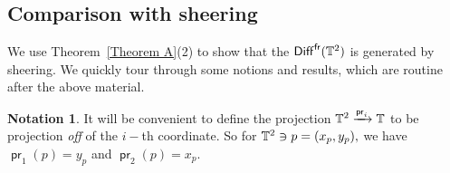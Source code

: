 \documentclass{amsart}
\theoremstyle{definition}
\newtheorem{notation}[theorem]{Notation}
\theoremstyle{remark}
\DeclareMathOperator{\pr}{\mathsf{pr}}
\DeclareMathOperator{\Diff}{{\sf Diff}}
\DeclareMathOperator{\fr}{\sf fr}
\newcommand{\xra}{\xrightarrow}
\begin{document}
\subsection{Comparison with sheering}
We use Theorem~\ref{Theorem A}(2) to show that the $\Diff^{\fr}(\TT^2)$ is generated by sheering.  
We quickly tour through some notions and results, which are routine after the above material.  

\begin{notation}
It will be convenient to define the projection $\TT^{2} \xra{\pr_{i}} \TT$ to be projection \textit{off} of the $i-$th coordinate. So for $\mathbb T^{2} \ni p = (x_{p}, y_{p}),$ we have $\pr_{1}(p) = y_{p}$ and $\pr_{2}(p) = x_{p}.$
\end{notation}
\end{document}
